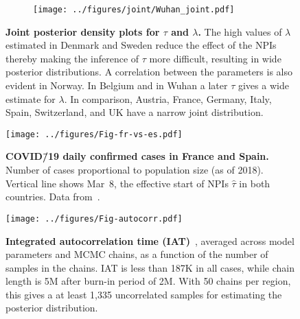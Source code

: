 \documentclass[12pt]{extarticle}
\newcommand{\covid}{COVID\=/19 }
\begin{document}
\begin{figure}[p]
\begin{subfigure}{0.32\textwidth}
        \texttt{[image: ../figures/joint/Wuhan\_joint.pdf]}
    \end{subfigure}
    \caption{
    \textbf{Joint posterior density plots for $\tau$ and $\lambda$.} The high values of $\lambda$ estimated in Denmark and Sweden reduce the effect of the NPIs thereby making the inference of $\tau$ more difficult, resulting in wide posterior distributions. A correlation between the parameters is also evident in Norway. In Belgium and in Wuhan a later $\tau$ gives a wide estimate for $\lambda$. In comparison, Austria, France, Germany, Italy, Spain, Switzerland, and UK have a narrow joint distribution.
    }
    \label{fig:joint}
\end{figure}



\begin{figure}[h]
    \centering
	\texttt{[image: ../figures/Fig-fr-vs-es.pdf]}
    \caption{
    \textbf{\covid daily confirmed cases in France and Spain.}
    Number of cases proportional to population size (as of 2018). 
    Vertical line shows Mar~8, the effective start of NPIs $\hat{\tau}$ in both countries.
    Data from~\citet{Flaxman2020}.
    } 
    \label{fig:fig-fr-vs-es}
\end{figure}



\begin{figure}[h]
    \centering
	\texttt{[image: ../figures/Fig-autocorr.pdf]}
    \caption{
    \textbf{Integrated autocorrelation time (IAT)}~\citep{Foreman-Mackey2013,Goodman2010}, averaged across model parameters and MCMC chains, as a function of the number of samples in the chains.
    IAT is less than 187K in all cases, while chain length is 5M after burn-in period of 2M. With 50 chains per region, this gives a at least 1,335 uncorrelated samples for estimating the posterior distribution.
    } 
    \label{fig:autocorr}
\end{figure}
\end{document}
